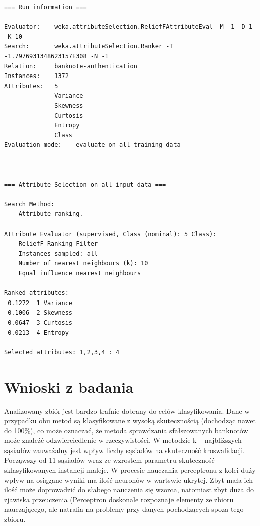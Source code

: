 \documentclass{classrep}
\begin{document}
\scriptsize
\begin{verbatim}
=== Run information ===

Evaluator:    weka.attributeSelection.ReliefFAttributeEval -M -1 -D 1 -K 10
Search:       weka.attributeSelection.Ranker -T -1.7976931348623157E308 -N -1
Relation:     banknote-authentication
Instances:    1372
Attributes:   5
              Variance
              Skewness
              Curtosis
              Entropy
              Class
Evaluation mode:    evaluate on all training data



=== Attribute Selection on all input data ===

Search Method:
	Attribute ranking.

Attribute Evaluator (supervised, Class (nominal): 5 Class):
	ReliefF Ranking Filter
	Instances sampled: all
	Number of nearest neighbours (k): 10
	Equal influence nearest neighbours

Ranked attributes:
 0.1272  1 Variance
 0.1006  2 Skewness
 0.0647  3 Curtosis
 0.0213  4 Entropy

Selected attributes: 1,2,3,4 : 4

\end{verbatim}
\normalsize

\section{Wnioski z badania}
Analizowany zbiór jest bardzo trafnie dobrany do celów klasyfikowania. Dane w przypadku obu metod są klasyfikowane z wysoką skutecznością (dochodząc nawet do 100\%), co może oznaczać, że metoda sprawdzania sfałszowanych banknotów może znaleźć odzwierciedlenie w rzeczywistości. W metodzie k – najbliższych sąsiadów zauważalny jest wpływ liczby sąsiadów na skuteczność kroswalidacji. Począwszy od 11 sąsiadów wraz ze wzrostem parametru skuteczność sklasyfikowanych instancji maleje. W procesie nauczania perceptronu z kolei duży wpływ na osiągane wyniki ma ilość neuronów w wartswie ukrytej. Zbyt mała ich ilość może doprowadzić do słabego nauczenia się wzorca, natomiast zbyt duża do zjawiska przeuczenia (Perceptron doskonale rozpoznaje elementy ze zbioru nauczającego, ale natrafia na problemy przy danych pochodzących spoza tego zbioru.
\end{document}
